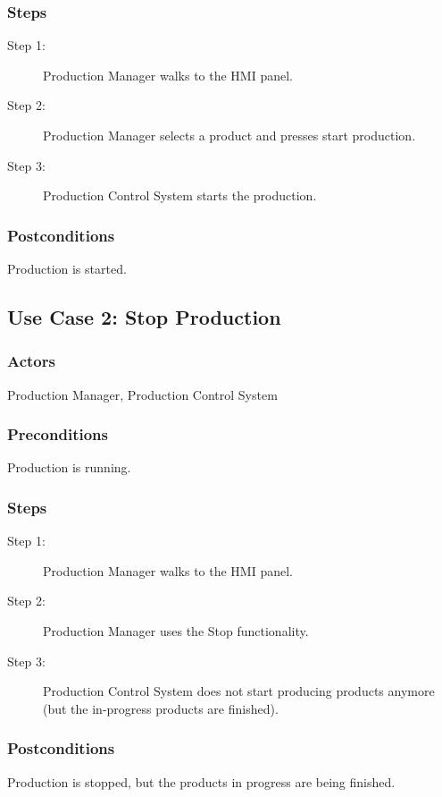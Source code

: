 \subsubsection{Steps}
\begin{description}
    \item[Step 1:] Production Manager walks to the HMI panel.
    \item[Step 2:] Production Manager selects a product and presses start production.
    \item[Step 3:] Production Control System starts the production.
\end{description}

\subsubsection{Postconditions}
Production is started.

\subsection{Use Case 2: Stop Production}

\subsubsection{Actors}
Production Manager, Production Control System

\subsubsection{Preconditions}
Production is running.

\subsubsection{Steps}
\begin{description}
    \item[Step 1:] Production Manager walks to the HMI panel.
    \item[Step 2:] Production Manager uses the Stop functionality.
    \item[Step 3:] Production Control System does not start producing products anymore (but the in-progress products are finished).
\end{description}

\subsubsection{Postconditions}
Production is stopped, but the products in progress are being finished.

